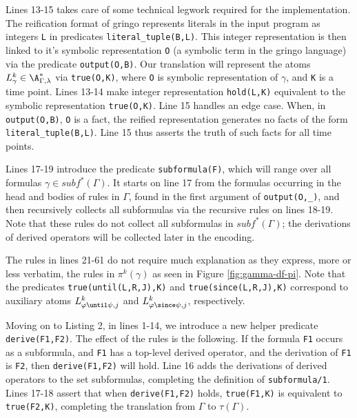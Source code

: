 Lines 13-15 takes care of some technical legwork required for the
implementation. The reification format of gringo represents literals
in the input program as integers \verb|L| in predicates
\verb|literal_tuple(B,L)|. This integer representation is then linked
to it's symbolic representation \verb|O| (a symbolic term in the
gringo language) via the predicate \verb|output(O,B)|. Our translation
will represent the atoms $L_\gamma^k \in \A_{\Gamma,\lambda}^*$ via
\verb|true(O,K)|, where \verb|O| is symbolic representation of
$\gamma$, and \verb|K| is a time point. Lines 13-14 make integer
representation \verb|hold(L,K)| equivalent to the symbolic
representation \verb|true(O,K)|. Line 15 handles an edge case. When,
in \verb|output(O,B)|, \verb|O| is a fact, the reified representation
generates no facts of the form \verb|literal_tuple(B,L)|. Line 15 thus
asserts the truth of such facts for all time points.

Lines 17-19 introduce the predicate \verb|subformula(F)|, which will
range over all formulas $\gamma \in subf^*(\Gamma)$. It starts on line
17 from the formulas occurring in the head and bodies of rules in
$\Gamma$, found in the first argument of \verb|output(O,_)|, and then
recursively collects all subformulas via the recursive rules on lines
18-19. Note that these rules do not collect all subformulas in
$subf^*(\Gamma)$; the derivations of derived operators will be
collected later in the encoding.

The rules in lines 21-61 do not require much explanation as they
express, more or less verbatim, the rules in $\pi^k(\gamma)$ as seen
in Figure \ref{fig:gamma-df-pi}. Note that the predicates
\verb|true(until(L,R,J),K)| and \verb|true(since(L,R,J),K)| correspond
to auxiliary atoms $L^k_{\varphi \until \psi,j}$ and
$L^k_{\varphi \since \psi,j}$, respectively.

Moving on to Listing 2, in lines 1-14, we introduce a new helper
predicate \verb|derive(F1,F2)|. The effect of the rules is the
following. If the formula \verb|F1| occurs as a subformula, and
\verb|F1| has a top-level derived operator, and the derivation of
\verb|F1| is \verb|F2|, then \verb|derive(F1,F2)| will hold. Line 16
adds the derivations of derived operators to the set subformulas,
completing the definition of \verb|subformula/1|. Lines 17-18 assert
that when \verb|derive(F1,F2)| holds, \verb|true(F1,K)| is equivalent
to \verb|true(F2,K)|, completing the translation from $\Gamma$ to
$\tau(\Gamma)$.




